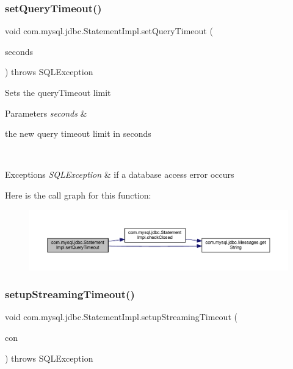 \subsubsection{\texorpdfstring{set\+Query\+Timeout()}{setQueryTimeout()}}
{\footnotesize\ttfamily void com.\+mysql.\+jdbc.\+Statement\+Impl.\+set\+Query\+Timeout (\begin{DoxyParamCaption}\item[{int}]{seconds }\end{DoxyParamCaption}) throws S\+Q\+L\+Exception}

Sets the query\+Timeout limit


\begin{DoxyParams}{Parameters}
{\em seconds} & 
\begin{DoxyItemize}
\item the new query timeout limit in seconds
\end{DoxyItemize}\\
\hline
\end{DoxyParams}

\begin{DoxyExceptions}{Exceptions}
{\em S\+Q\+L\+Exception} & if a database access error occurs \\
\hline
\end{DoxyExceptions}
Here is the call graph for this function\+:
\nopagebreak
\begin{figure}[H]
\begin{center}
\leavevmode
\includegraphics[width=350pt]{classcom_1_1mysql_1_1jdbc_1_1_statement_impl_a74950809ec8d20dc5df1e6163120b342_cgraph}
\end{center}
\end{figure}
\mbox{\label{classcom_1_1mysql_1_1jdbc_1_1_statement_impl_ab0949d4db6b617c32d22ace0ed1a7ac7}} 
\subsubsection{\texorpdfstring{setup\+Streaming\+Timeout()}{setupStreamingTimeout()}}
{\footnotesize\ttfamily void com.\+mysql.\+jdbc.\+Statement\+Impl.\+setup\+Streaming\+Timeout (\begin{DoxyParamCaption}\item[{\mbox{\hyperlink{interfacecom_1_1mysql_1_1jdbc_1_1_my_s_q_l_connection}{My\+S\+Q\+L\+Connection}}}]{con }\end{DoxyParamCaption}) throws S\+Q\+L\+Exception\hspace{0.3cm}{\ttfamily [protected]}}

